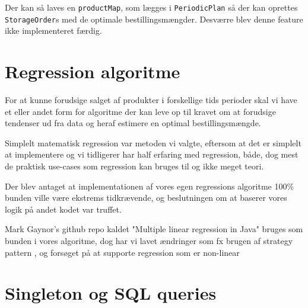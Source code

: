 Der kan så laves en \verb|productMap|, som lægges i \verb|PeriodicPlan| så der kan oprettes \verb|StorageOrder|s med de optimale bestillingsmængder. Desværre blev denne feature ikke implementeret færdig.

\section{Regression algoritme}
For at kunne forudsige salget af produkter i forskellige tids perioder skal vi have et eller andet form for algoritme der kan leve op til kravet om at forudsige tendenser ud fra data og heraf estimere en optimal bestillingsmængde.

Simplelt matematisk regression var metoden vi valgte, eftersom at det er simplelt at implementere og vi tidligerer har half erfaring med regression, både, dog mest de praktisk use-cases som regression kan bruges til og ikke meget teori.

Der blev antaget at implementationen af vores egen regressions algoritme 100\% bunden ville være ekstrems tidkrævende, og beslutningen om at baserer vores logik på andet kodet var truffet.

Mark Gaynor's github repo kaldet "Multiple linear regression in Java" \cite{MarkGaynorRegressin} bruges som bunden i vores algoritme, dog har vi lavet ændringer som fx brugen af strategy pattern \cite{Larman2004}, og forsøget på at supporte regression som er non-linear

\section{Singleton og SQL queries}


